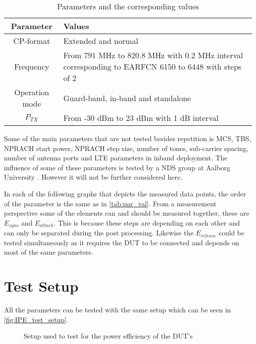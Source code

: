 \begin{table}[H]
\centering
\begin{tabular}{|c|p{8cm}|} \hline
\textbf{Parameter} & \textbf{Values} \\ \hline
CP-format & Extended and normal\\ \hline
Frequency & From 791 MHz to 820.8 MHz with 0.2 MHz interval corresponding to EARFCN 6150 to 6448 with steps of 2 \\ \hline
Operation mode & Guard-band, in-band and standalone \\ \hline
$P_{TX}$ & From -30 dBm to 23 dBm with 1 dB interval \\ \hline
\end{tabular}
\caption{Parameters and the corresponding values}
\label{tab:par_val}
\end{table}

Some of the main parameters that are not tested besides repetition is \gls{MCS}, \gls{TBS}, NPRACH start power, NPRACH step size, number of tones, sub-carrier spacing, number of antenna ports and LTE parameters in inband deployment. The influence of some of these parameters is tested by a NDS group at Aalborg University . However it will not be further considered here.

In each of the following graphs that depicts the measured data points, the order of the parameter is the same as in \autoref{tab:par_val}. From a measurement perspective some of the elements can and should be measured together, these are $E_{sync}$ and $E_{attach}$. This is because these steps are depending on each other and can only be separated during the  post processing. Likewise the $E_{release}$ could be tested simultaneously as it requires the DUT to be connected and depends on most of the same parameters.  



\section{Test Setup}
All the parameters can be tested with the same setup which can be seen in \autoref{fig:IPE_test_setup}.

\begin{figure}[H]
\centering

\caption{Setup used to test for the power efficiency of the \gls{DUT}'s}
\label{fig:IPE_test_setup}
\end{figure}


